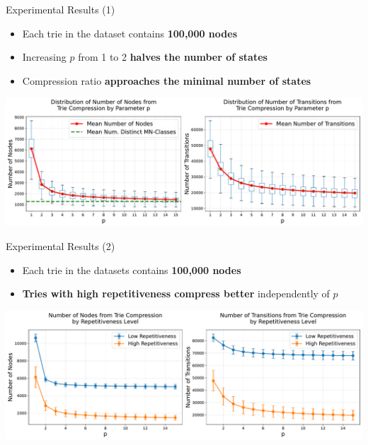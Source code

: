 \documentclass[aspectratio=169]{beamer}
\begin{document}
\begin{frame}{Experimental Results (1)}
	\begin{itemize}
		\item Each trie in the dataset contains \textcolor{oiBlue}{\textbf{100,000 nodes}}
		\item Increasing $p$ from 1 to 2 \textcolor{oiRed}{\textbf{halves the number of states}}
		\item Compression ratio \textcolor{oiGreen}{\textbf{approaches the minimal number of states}}
	\end{itemize}
	\centering
	\includegraphics[width=1\textwidth]{img/tree_compression_analysis.pdf}
\end{frame}

\begin{frame}{Experimental Results (2)}
	\begin{itemize}
		\item Each trie in the datasets contains \textcolor{oiBlue}{\textbf{100,000 nodes}}
		\item \textcolor{oiRed}{\textbf{Tries with high repetitiveness compress better}} independently of $p$
	\end{itemize}
	\centering
	\includegraphics[width=1\textwidth]{img/high_low_comparison.pdf}
\end{frame}

\end{document}
